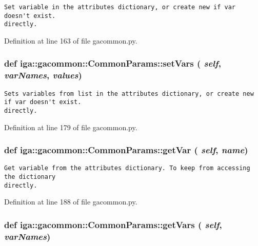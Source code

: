 \footnotesize\begin{verbatim}
Set variable in the attributes dictionary, or create new if var doesn't exist.
directly.
\end{verbatim}
\normalsize
 

Definition at line 163 of file gacommon.py.
\subsubsection{\setlength{\rightskip}{0pt plus 5cm}def iga::gacommon::CommonParams::setVars ( {\em self},  {\em varNames},  {\em values})}\label{classiga_1_1gacommon_1_1CommonParams_e627ae54a34c4dcc7b3325c987d496d0}




\footnotesize\begin{verbatim}
Sets variables from list in the attributes dictionary, or create new if var doesn't exist.
directly.
\end{verbatim}
\normalsize
 

Definition at line 179 of file gacommon.py.
\subsubsection{\setlength{\rightskip}{0pt plus 5cm}def iga::gacommon::CommonParams::getVar ( {\em self},  {\em name})}\label{classiga_1_1gacommon_1_1CommonParams_e7a6fee4a01e9f7525f356c1973ea409}




\footnotesize\begin{verbatim}
Get variable from the attributes dictionary. To keep from accessing the dictionary
directly.
\end{verbatim}
\normalsize
 

Definition at line 188 of file gacommon.py.
\subsubsection{\setlength{\rightskip}{0pt plus 5cm}def iga::gacommon::CommonParams::getVars ( {\em self},  {\em varNames})}\label{classiga_1_1gacommon_1_1CommonParams_71ed07bb06684e7221f61dd7fa4b2af9}




